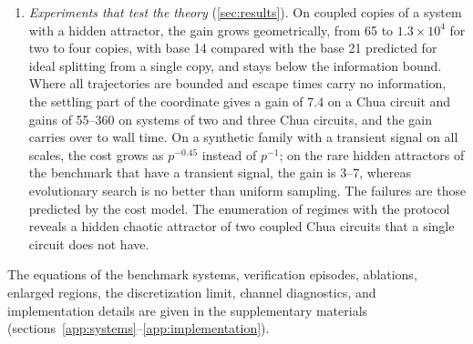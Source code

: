 \begin{enumerate}
\item \emph{Experiments that test the theory} (\cref{sec:results}). On coupled copies of a system with a hidden attractor, the gain grows geometrically, from 65 to $1.3\times10^4$ for two to four copies, with base 14 compared with the base 21 predicted for ideal splitting from a single copy, and stays below the information bound. Where all trajectories are bounded and escape times carry no information, the settling part of the coordinate gives a gain of 7.4 on a Chua circuit and gains of 55--360 on systems of two and three Chua circuits, and the gain carries over to wall time. On a synthetic family with a transient signal on all scales, the cost grows as $p^{-0.45}$ instead of $p^{-1}$; on the rare hidden attractors of the benchmark that have a transient signal, the gain is 3--7, whereas evolutionary search is no better than uniform sampling. The failures are those predicted by the cost model. The enumeration of regimes with the protocol reveals a hidden chaotic attractor of two coupled Chua circuits that a single circuit does not have.
\end{enumerate}
The equations of the benchmark systems, verification episodes, ablations, enlarged regions, the discretization limit, channel diagnostics, and implementation details are given in the supplementary materials (sections~\ref{app:systems}--\ref{app:implementation}).
